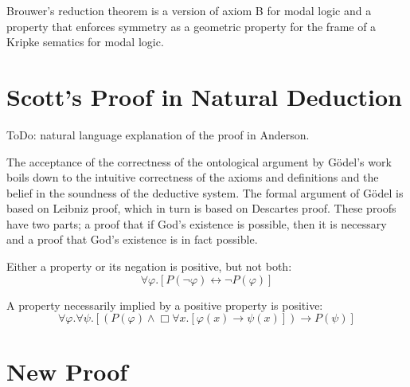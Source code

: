 \documentclass{llncs}
\newcommand{\imp}{\rightarrow}
\newcommand{\biimp}{\leftrightarrow}
\newcommand{\all}{\forall}
\newcommand{\nec}{\Box} %
\begin{document}
Brouwer's reduction theorem is a version of axiom B for modal logic and a property that enforces symmetry as a geometric property for the frame of a Kripke sematics for modal logic. \citep{negri}



\section{Scott's Proof in Natural Deduction}

\setcounter{axiom}{0}
\setcounter{lemma}{0}
\setcounter{theorem}{0}
\setcounter{corollary}{0}

ToDo: natural language explanation of the proof in Anderson.

The acceptance of the correctness of the ontological argument by G\"odel's work boils down to the intuitive correctness of the axioms and definitions and the belief in the soundness of the deductive system. The formal argument of G\"odel is based on Leibniz proof, which in turn is based on Descartes proof. These proofs have two parts; a proof that if God's existence is possible, then it is necessary and a proof that God's existence is in fact possible. 


\begin{axiom}
\label{A1}
Either a property or its negation is positive, but not both:
$$
\all \varphi. [P(\neg \varphi) \biimp \neg P(\varphi)]
$$
\end{axiom}

\begin{axiom}
\label{A2}
A property necessarily implied by a positive property is positive:
$$
\all \varphi. \all \psi.[(P(\varphi) \wedge \nec \all x.[\varphi(x) \imp \psi(x)]) \imp P(\psi)]
$$
\end{axiom}

\section{New Proof}
\setcounter{axiom}{0}
\setcounter{lemma}{0}
\setcounter{theorem}{0}
\setcounter{corollary}{0}
\end{document}
